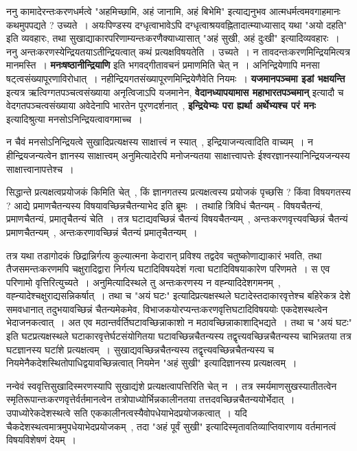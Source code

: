 	ननु कामादेरन्तःकरणधर्मत्वे  "अहमिच्छामि, अहं जानामि, अहं बिभेमि" इत्याद्यनुभव आत्मधर्मत्वमवगाहमानः कथमुपपद्यते ? उच्यते~। अयःपिण्डस्य दग्धृत्वाभावेऽपि दग्धृत्वाश्रयवह्नितादात्म्याध्यासाद् यथा "अयो दहति" इति व्यवहारः, तथा सुखाद्याकारपरिणाम्यन्तःकरणैक्याध्यासात् "अहं सुखी, अहं दुःखी" इत्यादिव्यवहारः~। ननु अन्तःकरणस्येन्द्रियतयाऽतीन्द्रियत्वात् कथं प्रत्यक्षविषयतेति~। उच्यते~। न तावदन्तःकरणमिन्द्रियमित्यत्र मानमस्ति~। {\bfseries मनःषष्ठानीन्द्रियाणि} इति भगवद्गीतावचनं प्रमाणमिति चेत् न~। अनिन्द्रियेणापि मनसा षट्त्वसंख्यापूरणाविरोधात्~। नहीन्द्रियगतसंख्यापूरणमिन्द्रियेणैवेति नियमः~। {\bfseries यजमानपञ्चमा इडां भक्षयन्ति} इत्यत्र ऋत्विग्गतपञ्चत्वसंख्याया अनृत्विजाऽपि यजमानेन, {\bfseries वेदानध्यापयामास महाभारतपञ्चमान्} इत्यादौ च वेदगतपञ्चत्वसंख्याया अवेदेनापि भारतेन पूरणदर्शनात्~, {\bfseries इन्द्रियेभ्यः परा ह्यर्था अर्थेभ्यश्च परं मनः} इत्यादिश्रुत्या मनसोऽनिन्द्रियत्वावगमाच्च~। \par
	न चैवं मनसोऽनिन्द्रियत्वे सुखादिप्रत्यक्षस्य साक्षात्त्वं न स्यात्~, इन्द्रियाजन्यत्वादिति वाच्यम्~। न हीन्द्रियजन्यत्वेन ज्ञानस्य साक्षात्त्वम् अनुमित्यादेरपि मनोजन्यतया साक्षात्त्वापत्तेः ईश्वरज्ञानस्यानिन्द्रियजन्यस्य साक्षात्त्वानापत्तेश्च~। \par
	सिद्धान्ते प्रत्यक्षत्वप्रयोजकं किमिति चेत्~, किं ज्ञानगतस्य प्रत्यक्षत्वस्य प्रयोजकं पृच्छसि ? किंवा विषयगतस्य ? आद्ये प्रमाणचैतन्यस्य विषयावच्छिन्नचैतन्याभेद इति ब्रूमः~। तथाहि त्रिविधं चैतन्यम् - विषयचैतन्यं, प्रमाणचैतन्यं, प्रमातृचैतन्यं चेति~। तत्र घटाद्यवच्छिन्नं चैतन्यं विषयचैतन्यम्~, अन्तःकरणवृत्त्यवच्छिन्नं चैतन्यं प्रमाणचैतन्यम्~, अन्तःकरणावच्छिन्नं चैतन्यं प्रमातृचैतन्यम्~।\par
	तत्र यथा तडागोदकं छिद्रान्निर्गत्य कुल्यात्मना केदारान् प्रविश्य तद्वदेव चतुष्कोणाद्याकारं भवति, तथा तैजसमन्तःकरणमपि चक्षुरादिद्वारा निर्गत्य घटादिविषयदेशं गत्वा घटादिविषयाकारेण परिणमते~। स एव परिणामो वृत्तिरित्युच्यते~। अनुमित्यादिस्थले तु अन्तःकरणस्य न वह्न्यादिदेशगमनम्~, वह्न्यादेश्चक्षुराद्यसन्निकर्षात्~। तथा च "अयं घटः" इत्यादिप्रत्यक्षस्थले घटादेस्तदाकारवृत्तेश्च बहिरेकत्र देशे समवधानात् तदुभयावच्छिन्नं चैतन्यमेकमेव, विभाजकयोरप्यन्तःकरणवृत्तिघटादिविषययोः एकदेशस्थत्वेन भेदाजनकत्वात्~। अत एव मठान्तर्वर्तिघटावच्छिन्नाकाशो न मठावच्छिन्नाकाशाद्भिद्यते~। तथा च "अयं घटः" इति घटप्रत्यक्षस्थले घटाकारवृत्तेर्घटसंयोगितया घटावच्छिन्नचैतन्यस्य तद्वृत्त्यवच्छिन्नचैतन्यस्य चाभिन्नतया तत्र घटज्ञानस्य घटांंशे प्रत्यक्षत्वम्~। सुखाद्यवच्छिन्नचैतन्यस्य तद्वृत्त्यवच्छिन्नचैतन्यस्य च नियमेनैकदेशस्थितोपाधिद्वयावच्छिन्नत्वात् नियमेन "अहं सुखी" इत्यादिज्ञानस्य प्रत्यक्षत्वम्~।\par
	नन्वेवं स्ववृत्तिसुखादिस्मरणस्यापि सुखाद्यंशे प्रत्यक्षत्वापत्तिरिति चेत् न~। तत्र स्मर्यमाणसुखस्यातीतत्वेन स्मृतिरूपान्तःकरणवृत्तेर्वर्तमानत्वेन तत्रोपाध्योर्भिन्नकालीनतया तत्तदवच्छिन्नचैतन्ययोर्भेदात्~। उपाध्योरेकदेशस्थत्वे सति एककालीनत्वस्यैवोपधेयाभेदप्रयोजकत्वात्~। यदि चैकदेशस्थत्वमात्रमुपधेयाभेदप्रयोजकम्~, तदा "अहं पूर्वं सुखी" इत्यादिस्मृतावतिव्याप्तिवारणाय वर्तमानत्वं विषयविशेषणं देयम्~।\par
